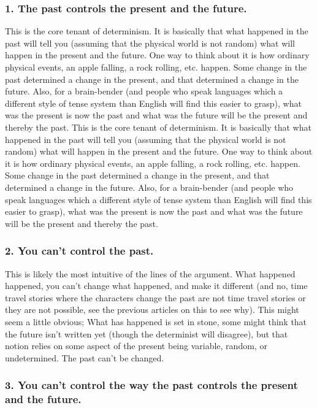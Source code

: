 \subsubsection{1. The past controls the present and the future.}

This is the core tenant of determinism. It is basically that what happened in the past will tell you (assuming that the physical world is not random) what will happen in the present and the future. One way to think about it is how ordinary physical events, an apple falling, a rock rolling, etc. happen. Some change in the past determined a change in the present, and that determined a change in the future. Also, for a brain-bender (and people who speak languages which a different style of tense system than English will find this easier to grasp), what was the present is now the past and what was the future will be the present and thereby the past. This is the core tenant of determinism. It is basically that what happened in the past will tell you (assuming that the physical world is not random) what will happen in the present and the future. One way to think about it is how ordinary physical events, an apple falling, a rock rolling, etc. happen. Some change in the past determined a change in the present, and that determined a change in the future. Also, for a brain-bender (and people who speak languages which a different style of tense system than English will find this easier to grasp), what was the present is now the past and what was the future will be the present and thereby the past.
\subsubsection{2. You can't control the past.}

This is likely the most intuitive of the lines of the argument. What happened happened, you can’t change what happened, and make it different (and no, time travel stories where the characters change the past are not time travel stories or they are not possible, see the previous articles on this to see why). This might seem a little obvious; What has happened is set in stone, some might think that the future isn't written yet (though the determinist will disagree), but that notion relies on some aspect of the present being variable, random, or undetermined. The past can't be changed. 
\subsubsection{3. You can't control the way the past controls the present and the future.}

